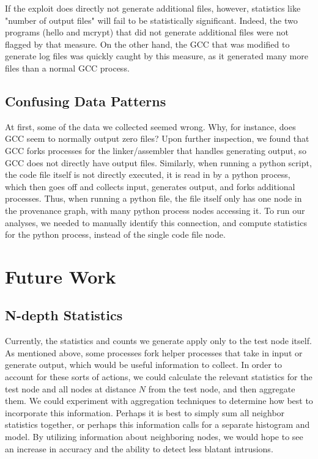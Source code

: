 \documentclass[10pt,twocolumn]{article}
\begin{document}
If the exploit does directly not generate additional files, however, statistics like "number of output files" will fail to be statistically significant. Indeed, the two programs (hello and mcrypt) that did not generate additional files were not flagged by that measure. On the other hand, the GCC that was modified to generate log files was quickly caught by this measure, as it generated many more files than a normal GCC process. 

\subsection{Confusing Data Patterns}
At first, some of the data we collected seemed wrong. Why, for instance, does GCC seem to normally output zero files? Upon further inspection, we found that GCC forks processes for the linker/assembler that handles generating output, so GCC does not directly have output files. Similarly, when running a python script, the code file itself is not directly executed, it is read in by a python process, which then goes off and collects input, generates output, and forks additional processes. Thus, when running a python file, the file itself only has one node in the provenance graph, with many python process nodes accessing it. To run our analyses, we needed to manually identify this connection, and compute statistics for the python process, instead of the single code file node.
%

\section{Future Work}
\subsection{N-depth Statistics}
Currently, the statistics and counts we generate apply only to the test node itself. As mentioned above, some processes fork helper processes that take in input or generate output, which would be useful information to collect. In order to account for these sorts of actions, we could calculate the relevant statistics for the test node and all nodes at distance $N$ from the test node, and then aggregate them. We could experiment with aggregation techniques to determine how best to incorporate this information. Perhaps it is best to simply sum all neighbor statistics together, or perhaps this information calls for a separate histogram and model. By utilizing information about neighboring nodes, we would hope to see an increase in accuracy and the ability to detect less blatant intrusions.
\end{document}
